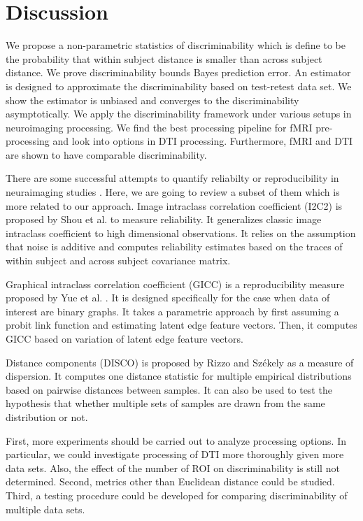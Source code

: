\documentclass{article}
\begin{document}
\section{Discussion}

 We propose a non-parametric statistics of discriminability which is define to be the probability that within subject distance is smaller than across subject distance.  We prove discriminability bounds Bayes prediction error. An estimator is designed to approximate the discriminability based on test-retest data set. We show the estimator is unbiased and converges to the discriminability asymptotically. We apply the discriminability framework under various setups in neuroimaging processing. We find the best processing pipeline for fMRI pre-processing and look into options in DTI processing. Furthermore, fMRI and DTI are shown to have comparable discriminability.

 There are some successful attempts to quantify reliabilty or reproducibility in neuraimaging studies \cite{shrout1979intraclass}\cite{strother2002quantitative}\cite{rizzo2010disco}\cite{zuo2010reliable}\cite{braun2012test}\cite{shou2013quantifying}\cite{yue2015estimating}. Here, we are going to review a subset of them which is more related to our approach. Image intraclass correlation coefficient (I2C2) is proposed by Shou et al. to measure reliability\cite{shou2013quantifying}. It generalizes classic image intraclass coefficient to high dimensional observations. It relies on the assumption that noise is additive and computes reliability estimates based on the traces of within subject and across subject covariance matrix. 

Graphical intraclass correlation coefficient (GICC) is a reproducibility measure proposed by Yue et al. \cite{yue2015estimating}. It is designed specifically for the case when data of interest are binary graphs. It takes a parametric approach by first assuming a probit link function and estimating latent edge feature vectors. Then, it computes GICC based on variation of latent edge feature vectors.

Distance components (DISCO) is proposed by Rizzo and Sz{\'e}kely as a measure of dispersion. It computes one distance statistic for multiple empirical distributions based on pairwise distances between samples. It can also be used to test the hypothesis that whether multiple sets of samples are drawn from the same distribution or not. 


 First, more experiments should be carried out to analyze processing options. In particular, we could investigate processing of DTI more thoroughly given more data sets. Also, the effect of the number of ROI on discriminability is still not determined. Second, metrics other than Euclidean distance could be studied. Third, a testing procedure could be developed for comparing discriminability of multiple data sets.
\end{document}
